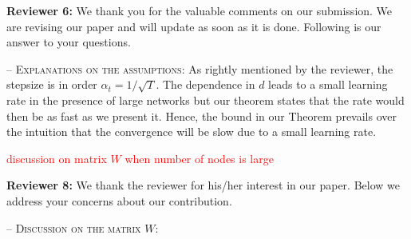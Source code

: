 \documentclass{article} %
\begin{document}
\textbf{Reviewer 6:}
We thank you for the valuable comments on our submission. We are revising our paper and will update as soon as it is done. Following is our answer to your questions. \vspace{-4pt}


\textsc{-- Explanations on the assumptions:}
As rightly mentioned by the reviewer, the stepsize is in order $\alpha_t = 1/\sqrt{T}$. The dependence in $d$ leads to a small learning rate in the presence of large networks but our theorem states that the rate would then be as fast as we present it. 
Hence, the bound in our Theorem prevails over the intuition that the convergence will be slow due to a small learning rate.

\textcolor{red}{discussion on matrix $W$ when number of nodes is large}






\textbf{Reviewer 8:} 
We thank the reviewer for his/her interest in our paper. Below we address your concerns about our contribution. \vspace{-4pt}


\textsc{-- Discussion on the matrix $W$:}
\end{document}
